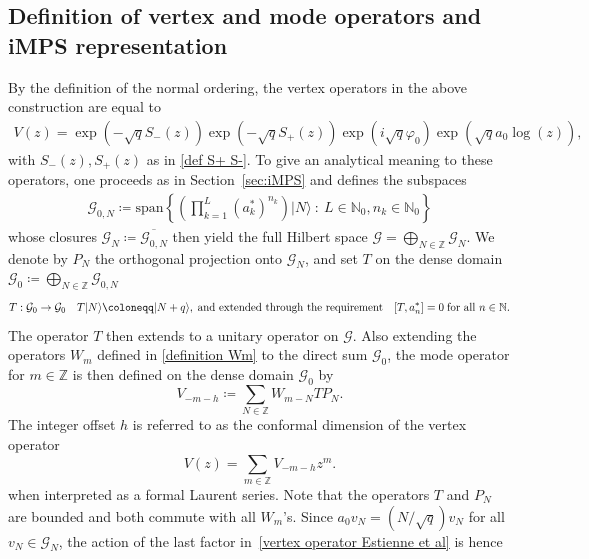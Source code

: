 \documentclass[letterpaper, DIV=17]{scrartcl}
\numberwithin{equation}{section}
\theoremstyle{definition}
\begin{document}
\subsection{Definition of vertex and mode operators and iMPS representation}
%
By the definition of the normal ordering, the vertex operators in the above construction are equal to 
\begin{align} \label{vertex operator Estienne et al}
	V(z) = \exp\left(-\sqrt{q} S_-(z)\right) \exp\left(-\sqrt{q} S_+(z)\right) \exp(i \sqrt{q} \varphi_0) \exp(\sqrt{q} a_0 \log(z)),
\end{align}
with $S_-(z), S_+(z)$ as in \eqref{def S+ S-}. To give an analytical meaning to these operators, one proceeds as in Section~\ref{sec:iMPS} and defines the subspaces 
\begin{align*}
		\mathcal{G}_{0,N} \coloneqq \mathrm{span}\left\{ \left(\prod_{k=1}^L (a_{k}^*)^{n_k}\right) \vert N \rangle \ : \ L\in \mathbb{N}_0, n_k \in \mathbb{N}_0 \right\} 
	\end{align*}
	whose closures $ \mathcal{G}_{N} \coloneqq \overline{ \mathcal{G}_{0,N}} $ then yield the full Hilbert space $ \mathcal{G} =  \bigoplus_{N\in \mathbb{Z}} \mathcal{G}_{N} $.
	We denote by $P_N$  the orthogonal projection onto $  \mathcal{G}_{N}  $, and set $ T $ on the dense domain $\mathcal{G}_0 \coloneqq  \bigoplus_{N\in \mathbb{Z}} \mathcal{G}_{0,N} $
	\begin{align*}
		T :  \mathcal{G}_0  \rightarrow  \mathcal{G}_0  \quad T \vert N \rangle \coloneqq \vert N+q \rangle , \; \mbox{and extended through the requirement} \quad [ T, a_n^* ] = 0 \; \mbox{for all $ n \in \mathbb{N} $.}
	\end{align*}
	The operator $T$ then extends to a unitary operator on $\mathcal{G}$. 
	Also extending the operators $W_m$ defined in \eqref{definition Wm} to the direct sum  $\mathcal{G}_0 $, the mode operator for $ m \in \mathbb{Z} $  is then defined on the dense domain $\mathcal{G}_0 $ by
	\begin{equation} \label{definition Vm}
		V_{-m-h} \coloneqq \sum_{N\in \mathbb{Z}} W_{m-N} T P_N .
	\end{equation}
	The integer offset $h$ is referred to as the conformal dimension of the vertex operator
	\begin{equation} \label{mode operators Estienne et al}
	V(z) = \sum_{m\in \mathbb{Z}} V_{-m-h} z^m .
\end{equation}
	when interpreted as a formal Laurent series. Note that
	the operators $T$ and $P_N$ are bounded and both commute with all $W_m$'s. Since $a_0 v_N = (N/\sqrt{q})  v_N$ for all $v_N \in \mathcal{G}_N$, the action of the last factor in~\eqref{vertex operator Estienne et al} is hence
\end{document}

